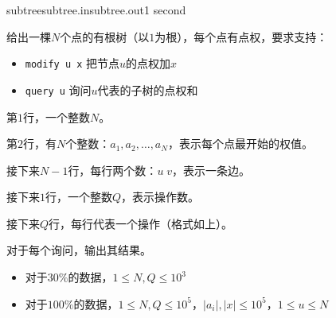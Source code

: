 \documentclass[11pt,a4paper,oneside]{article}
\begin{document}
	
	\begin{problem}{subtree}{subtree.in}{subtree.out}{1 second} 
		
		给出一棵$N$个点的有根树（以$1$为根），每个点有点权，要求支持：
		
		\begin{itemize}
			\item \texttt{modify u x} 把节点$u$的点权加$x$
			\item \texttt{query u} 询问$u$代表的子树的点权和
		\end{itemize}
		
		\InputFile
		
		第$1$行，一个整数$N$。
		
		第$2$行，有$N$个整数：$a_1,a_2,\dots,a_N$，表示每个点最开始的权值。
		
		接下来$N-1$行，每行两个数：$u \; v$，表示一条边。
		
		接下来$1$行，一个整数$Q$，表示操作数。
		
		接下来$Q$行，每行代表一个操作（格式如上）。
		
		\OutputFile
		
		对于每个询问，输出其结果。
		
		\Example
		
		\begin{example}
	\end{example}
	
	
	\Note
	
	\begin{itemize}
		\item 对于$30\%$的数据，$1 \leq N, Q \leq 10^3$
		\item 对于$100\%$的数据，$ 1 \leq N, Q \leq 10^5$，$|a_i| , | x | \leq 10^5 $，$ 1 \leq u \leq N $
	\end{itemize}
	
\end{problem}
	
\end{document}
